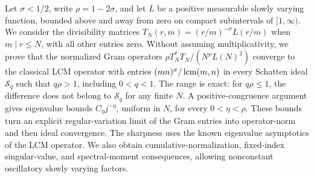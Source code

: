 Let $\sigma<1/2$, write $\rho=1-2\sigma$, and let $L$ be a positive
measurable slowly varying function, bounded above and away from zero on
compact subintervals of $[1,\infty)$. We consider the divisibility matrices
$T_N(r,m)=(r/m)^{-\sigma}L(r/m)$ when $m\mid r\le N$, with all other
entries zero. Without assuming multiplicativity, we prove that the
normalized Gram operators $\rho T_N^*T_N/(N^\rho L(N)^2)$ converge to
the classical LCM operator with entries $(mn)^\sigma/\operatorname{lcm}(m,n)$ in
every Schatten ideal $\mathcal S_q$ such that $q\rho>1$, including
$0<q<1$. The range is exact: for $q\rho\le1$, the difference does not
belong to $\mathcal S_q$ for any finite $N$. A positive-congruence
argument gives eigenvalue bounds $C_\eta j^{-\eta}$, uniform in $N$,
for every $0<\eta<\rho$. These bounds turn an explicit regular-variation
limit of the Gram entries into operator-norm and then ideal convergence.
The sharpness uses the known eigenvalue asymptotics of the LCM operator.
We also obtain cumulative-normalization, fixed-index singular-value,
and spectral-moment consequences, allowing nonconstant oscillatory
slowly varying factors.
